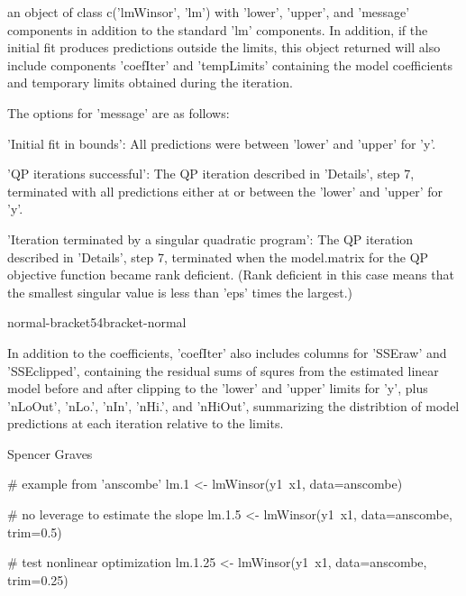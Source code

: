 \begin{Value}
an object of class c('lmWinsor', 'lm') with 'lower', 'upper', and
'message' components in addition to the standard 'lm' components.  In
addition, if the initial fit produces predictions outside the limits,
this object returned will also include components 'coefIter' and
'tempLimits' containing the model coefficients and temporary limits
obtained during the iteration.  

The options for 'message' are as follows:  

\begin{ldescription}
\item[\code{1}] 'Initial fit in bounds':  All predictions were between 'lower' and
'upper' for 'y'. 

\item[\code{2}] 'QP iterations successful':  The QP iteration described in
'Details', step 7, terminated with all predictions either at or
between the 'lower' and 'upper' for 'y'.  

\item[\code{3}] 'Iteration terminated by a singular quadratic program':  The QP
iteration described in 'Details', step 7, terminated when the
model.matrix for the QP objective function became rank deficient.
(Rank deficient in this case means that the smallest singular
value is less than 'eps' times the largest.) 

\end{ldescription}

normal-bracket54bracket-normal

In addition to the coefficients, 'coefIter' also includes columns for
'SSEraw' and 'SSEclipped', containing the residual sums of squres from
the estimated linear model before and after clipping to the 'lower'
and 'upper' limits for 'y', plus 'nLoOut', 'nLo.', 'nIn', 'nHi.', and
'nHiOut', summarizing the distribtion of model predictions at each
iteration relative to the limits.
\end{Value}
\begin{Author}\relax
Spencer Graves
\end{Author}
\begin{SeeAlso}\relax
{}
\end{SeeAlso}
\begin{Examples}
\begin{ExampleCode}
# example from 'anscombe' 
lm.1 <- lmWinsor(y1~x1, data=anscombe)

# no leverage to estimate the slope 
lm.1.5 <- lmWinsor(y1~x1, data=anscombe, trim=0.5)

# test nonlinear optimization  
lm.1.25 <- lmWinsor(y1~x1, data=anscombe, trim=0.25)

\end{ExampleCode}
\end{Examples}

